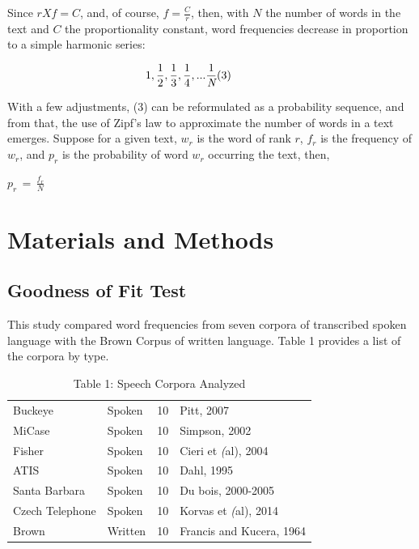 \documentclass[12pt]{article}
\begin{document}
Since $r X f = C$, and, of course, $f = \frac{C}{r}$, then, with $N$ the number of words in the text and $C$ the proportionality constant, word frequencies decrease in proportion to a simple harmonic series:

\setlength{\abovedisplayskip}{1pt}
\setlength{\belowdisplayskip}{1pt}
\begin{center}
\begin{equation*}
\begin{aligned}
1,\frac{1}{2},\frac{1}{3},\frac{1}{4},...\frac{1}{\emph{N}}\hspace{4em (3)}
\end{aligned}
\end{equation*}
\end{center}
\noindent
With a few adjustments, (3) can be reformulated as a probability sequence, and from that, the use of Zipf's law to approximate the number of words in a text emerges. Suppose for a given text, $w_r$ is the word of rank $r$, $f_r$ is the frequency of $w_r$, and $p_r$ is the probability of word $w_r$ occurring the text, then,
\begin{center}
$p_r\, =\, \frac{f_r}{N}$    \hspace{4em (4)}
\end{center}
\noindent
















\section{Materials and Methods}
\subsection{Goodness of Fit Test}

This study compared word frequencies from seven corpora of transcribed spoken language with the Brown Corpus of written language.  Table 1 provides a list of the corpora by type. 

\begin{table}[H]
\caption{Table 1: Speech Corpora Analyzed}
\begin{center}
\begin{tabular}{ |l|l|l|l| } 
 \hline
 Buckeye & Spoken & 10 & Pitt, 2007 \\ 
 MiCase & Spoken & 10 & Simpson, 2002 \\
 Fisher & Spoken & 10 & Cieri et \emph(al), 2004 \\ 
 ATIS   & Spoken & 10 & Dahl, 1995 \\
 Santa Barbara & Spoken & 10 & Du bois, 2000-2005 \\
 Czech Telephone & Spoken & 10 & Korvas et \emph(al), 2014 \\
 Brown & Written & 10 & Francis and Kucera, 1964 \\
 \hline
\end{tabular}
\end{center}
\end{table}
\end{document}
